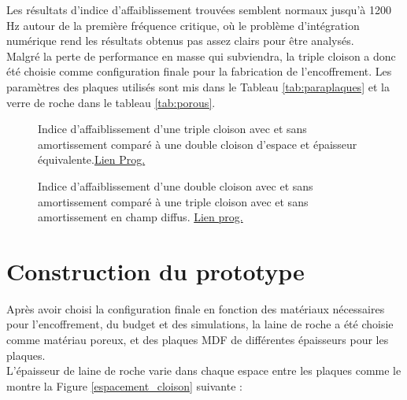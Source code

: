 \documentclass[12pt,foolscap]{report}
\begin{document}
	Les résultats d'indice d'affaiblissement trouvées semblent normaux jusqu'à 1200 Hz autour de la première fréquence critique, où le problème d'intégration numérique rend les résultats obtenus pas assez clairs pour être analysés.\\
	Malgré la perte de performance en masse qui subviendra, la triple cloison a donc été choisie comme configuration finale pour la fabrication de l'encoffrement. Les paramètres des plaques utilisés sont mis dans le Tableau \ref{tab:paraplaques} et la verre de roche dans le tableau \ref{tab:porous}.
	
	\begin{figure}[h]
		\begin{minipage}[c]{.45\linewidth}
			\begin{center}
				\caption{Indice d'affaiblissement d'une triple cloison avec et sans amortissement comparé à une double cloison d'espace et épaisseur équivalente.\href{https://github.com/Nuopel/Encoffrement/blob/master/Programme/comptriple_double_equivalente.m}{Lien Prog.}}
				\label{compeq}
			\end{center}
		\end{minipage}
		\hfill
		\begin{minipage}[c]{.45\linewidth}
			\begin{center}
				\caption{ Indice d’affaiblissement d’une double cloison avec et sans amortissement comparé à une triple cloison avec et sans amortissement en champ diffus. \href{https://github.com/Nuopel/Encoffrement/blob/master/Programme/Champ_diffu_TransMat.m}{Lien prog.}}
				\label{compoptdiffus}
			\end{center}
		\end{minipage}
	\end{figure}
	
	\section{Construction du prototype}
	
	Après avoir choisi la configuration finale en fonction des matériaux nécessaires pour l'encoffrement, du budget et des simulations, la laine de roche a été choisie comme matériau poreux, et des plaques MDF de différentes épaisseurs pour les plaques.\\
	L'épaisseur de laine de roche varie dans chaque espace entre les plaques comme le montre la Figure \ref{espacement_cloison} suivante : \\ \\
	
\end{document}

